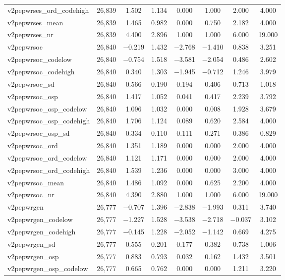 \begin{table}[!htbp]
\begin{tabular}{@{\extracolsep{5pt}}lccccccc}
v2pepwrses\_ord\_codehigh & 26,839 & 1.502 & 1.134 & 0.000 & 1.000 & 2.000 & 4.000 \\ 
v2pepwrses\_mean & 26,839 & 1.465 & 0.982 & 0.000 & 0.750 & 2.182 & 4.000 \\ 
v2pepwrses\_nr & 26,839 & 4.400 & 2.896 & 1.000 & 1.000 & 6.000 & 19.000 \\ 
v2pepwrsoc & 26,840 & $-$0.219 & 1.432 & $-$2.768 & $-$1.410 & 0.838 & 3.251 \\ 
v2pepwrsoc\_codelow & 26,840 & $-$0.754 & 1.518 & $-$3.581 & $-$2.054 & 0.486 & 2.602 \\ 
v2pepwrsoc\_codehigh & 26,840 & 0.340 & 1.303 & $-$1.945 & $-$0.712 & 1.246 & 3.979 \\ 
v2pepwrsoc\_sd & 26,840 & 0.566 & 0.190 & 0.194 & 0.406 & 0.713 & 1.018 \\ 
v2pepwrsoc\_osp & 26,840 & 1.417 & 1.052 & 0.041 & 0.417 & 2.239 & 3.792 \\ 
v2pepwrsoc\_osp\_codelow & 26,840 & 1.096 & 1.032 & 0.000 & 0.008 & 1.928 & 3.679 \\ 
v2pepwrsoc\_osp\_codehigh & 26,840 & 1.706 & 1.124 & 0.089 & 0.620 & 2.584 & 4.000 \\ 
v2pepwrsoc\_osp\_sd & 26,840 & 0.334 & 0.110 & 0.111 & 0.271 & 0.386 & 0.829 \\ 
v2pepwrsoc\_ord & 26,840 & 1.351 & 1.189 & 0.000 & 0.000 & 2.000 & 4.000 \\ 
v2pepwrsoc\_ord\_codelow & 26,840 & 1.121 & 1.171 & 0.000 & 0.000 & 2.000 & 4.000 \\ 
v2pepwrsoc\_ord\_codehigh & 26,840 & 1.539 & 1.236 & 0.000 & 0.000 & 3.000 & 4.000 \\ 
v2pepwrsoc\_mean & 26,840 & 1.486 & 1.092 & 0.000 & 0.625 & 2.200 & 4.000 \\ 
v2pepwrsoc\_nr & 26,840 & 4.390 & 2.880 & 1.000 & 1.000 & 6.000 & 19.000 \\ 
v2pepwrgen & 26,777 & $-$0.707 & 1.396 & $-$2.838 & $-$1.993 & 0.311 & 3.740 \\ 
v2pepwrgen\_codelow & 26,777 & $-$1.227 & 1.528 & $-$3.538 & $-$2.718 & $-$0.037 & 3.102 \\ 
v2pepwrgen\_codehigh & 26,777 & $-$0.145 & 1.228 & $-$2.052 & $-$1.142 & 0.669 & 4.275 \\ 
v2pepwrgen\_sd & 26,777 & 0.555 & 0.201 & 0.177 & 0.382 & 0.738 & 1.006 \\ 
v2pepwrgen\_osp & 26,777 & 0.883 & 0.793 & 0.032 & 0.162 & 1.432 & 3.501 \\ 
v2pepwrgen\_osp\_codelow & 26,777 & 0.665 & 0.762 & 0.000 & 0.000 & 1.211 & 3.220 \\ 

\end{tabular}
\end{table}
